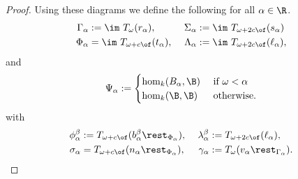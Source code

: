 \begin{proof}

  Using these diagrams we define the following for all $\alpha\in\R$.
  \begin{align*}
    \Gamma_\alpha &:=\im~T_\omega(r_\alpha),&\  \Sigma_\alpha &:= \im~T_{\omega+2c\of}(s_\alpha)\\
    \Phi_\alpha &= \im~ T_{\omega+c\of}(t_\alpha),&\ \Lambda_\alpha &:=\im~T_{\omega+2c\of}(\ell_\alpha),\\
  \end{align*}
  and
  \[ \Psi_\alpha := \begin{cases} \hom_k(B_\alpha, \B)&\text{ if } \omega < \alpha\\ \hom_k(\B, \B)&\text{ otherwise.}\end{cases} \]
  with
  \begin{align*}
    \phi_\alpha^\beta &:= T_{\omega+c\of}(b_\alpha^\beta\rest_{\Phi_\alpha}),&\ \lambda_\alpha^\beta &:= T_{\omega+2c\of}(\ell_\alpha),\\
    \sigma_\alpha &= T_{\omega+c\of}(n_\alpha\rest_{\Phi_\alpha}),&\ \gamma_\alpha &:= T_\omega(v_\alpha\rest_{\Gamma_\alpha}).
  \end{align*}


\end{proof}
